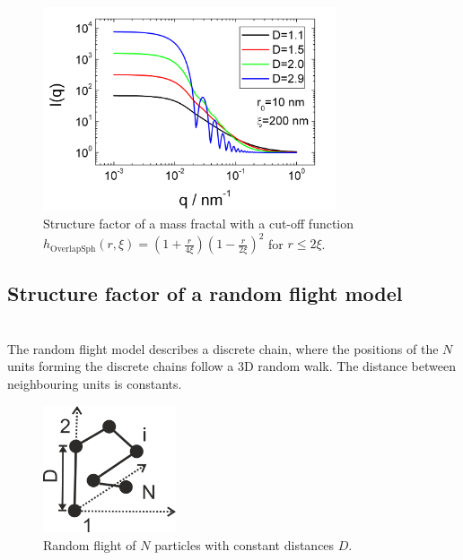 \begin{figure}[htb]
\begin{center}
\includegraphics[width=0.768\textwidth]{../images/structure_factor/MassFractals/SQOverlapSphCutOff.png}
\end{center}
\caption{Structure factor of a mass fractal with a
cut-off function $h_\text{OverlapSph}(r,\xi) = \left(1+\frac{r}{4\xi}\right)\left(1-\frac{r}{2\xi}\right)^2$ for $r\leq 2\xi$.}
\label{fig:SQOverlappSphCutOff}
\end{figure}

\clearpage
\subsection{Structure factor of a random flight model} \hspace{1pt}\\
The random flight model describes a discrete chain, where the positions of the $N$ units forming the discrete chains follow a 3D random walk. The distance between neighbouring units is constants.

\begin{figure}[htb]
\begin{center}
\includegraphics[width=0.35\textwidth]{../images/structure_factor/randomflight3D.png}
\end{center}
\caption{Random flight of $N$ particles with constant distances $D$.}
\label{fig:randomflight3D}
\end{figure}

